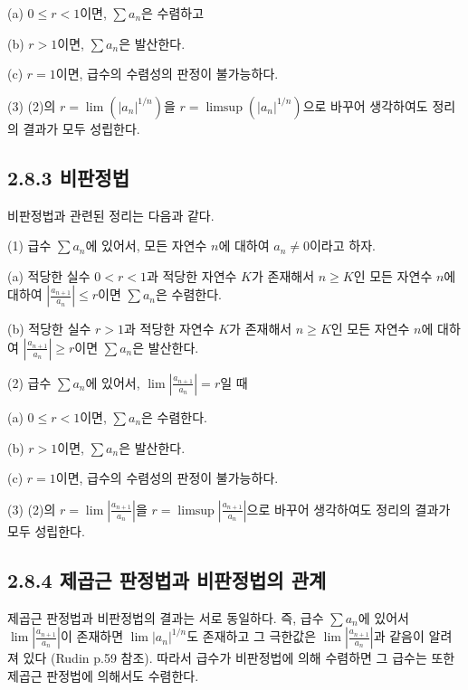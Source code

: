 \documentclass{article}
\begin{document}
(a) \( 0 \leq r < 1 \)이면, \( \sum a_n \)은 수렴하고

(b) \( r > 1 \)이면, \( \sum a_n \)은 발산한다.

(c) \( r = 1 \)이면, 급수의 수렴성의 판정이 불가능하다.

(3) (2)의 \( r = \lim \left( \left| a_n \right|^{1/n} \right) \)을 \( r = \limsup \left( \left| a_n \right|^{1/n} \right) \)으로 바꾸어 생각하여도 정리의 결과가 모두 성립한다.

\subsection*{\textmd{2.8.3 비판정법}}

비판정법과 관련된 정리는 다음과 같다.

(1) 급수 \( \sum a_n \)에 있어서, 모든 자연수 \( n \)에 대하여 \( a_n \neq 0 \)이라고 하자.

(a) 적당한 실수 \( 0 < r < 1 \)과 적당한 자연수 \( K \)가 존재해서 \( n \geq K \)인 모든 자연수 \( n \)에 대하여 \( \left| \frac{a_{n+1}}{a_n} \right| \leq r \)이면 \( \sum a_n \)은 수렴한다.

(b) 적당한 실수 \( r > 1 \)과 적당한 자연수 \( K \)가 존재해서 \( n \geq K \)인 모든 자연수 \( n \)에 대하여 \( \left| \frac{a_{n+1}}{a_n} \right| \geq r \)이면 \( \sum a_n \)은 발산한다.

(2) 급수 \( \sum a_n \)에 있어서, \( \lim \left| \frac{a_{n+1}}{a_n} \right| = r \)일 때

(a) \( 0 \leq r < 1 \)이면, \( \sum a_n \)은 수렴한다.

(b) \( r > 1 \)이면, \( \sum a_n \)은 발산한다.

(c) \( r = 1 \)이면, 급수의 수렴성의 판정이 불가능하다.

(3) (2)의 \( r = \lim \left| \frac{a_{n+1}}{a_n} \right| \)을 \( r = \limsup \left| \frac{a_{n+1}}{a_n} \right| \)으로 바꾸어 생각하여도 정리의 결과가 모두 성립한다.

\subsection*{\textmd{2.8.4 제곱근 판정법과 비판정법의 관계}}

제곱근 판정법과 비판정법의 결과는 서로 동일하다. 즉, 급수 \( \sum a_n \)에 있어서 \( \lim \left| \frac{a_{n+1}}{a_n} \right| \)이 존재하면 \( \lim \left| a_n \right|^{1/n} \)도 존재하고 그 극한값은 \( \lim \left| \frac{a_{n+1}}{a_n} \right| \)과 같음이 알려져 있다 (Rudin p.59 참조). 따라서 급수가 비판정법에 의해 수렴하면 그 급수는 또한 제곱근 판정법에 의해서도 수렴한다.
\end{document}
